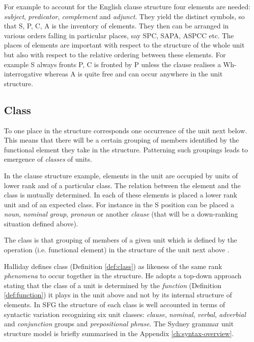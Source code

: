 For example to account for the English clause structure four elements are needed: \textit{subject}, \textit{predicator}, \textit{complement} and \textit{adjunct}. They yield the distinct symbols, so that S, P, C, A is the inventory of elements. They then can be arranged in various orders falling in particular places, say SPC, SAPA, ASPCC etc. The places of elements are important with respect to the structure of the whole unit but also with respect to the relative ordering between these elements. For example S always fronts P, C is fronted by P unless the clause realises a Wh-interrogative whereas A is quite free and can occur anywhere in the unit structure. 

\subsection{Class}

To one place in the structure corresponds one occurrence of the unit next below. This means that there will be a certain grouping of members identified by the functional element they take in the structure. Patterning such groupings leads to emergence of \textit{classes} of units.

In the clause structure example, elements in the unit are occupied by units of lower rank and of a particular class. The relation between the element and the class is mutually determined. In each of these elements is placed a lower rank unit and of an expected class. For instance in the S position can be placed a \textit{noun}, \textit{nominal group}, \textit{pronoun} or another \textit{clause} (that will be a down-ranking situation defined above).

\begin{definition}[Class]\label{def:class}
	The class is that grouping of members of a given unit which is defined by the operation (i.e. functional element) in the structure of the unit next above \citep[49]{Halliday2002}.
\end{definition}

Halliday defines class (Definition \ref{def:class}) as likeness of the same rank \textit{phenomena} to occur together in the structure. He adopts a top-down approach stating that the class of a unit is determined by the \textit{function} (Definition \ref{def:function}) it plays in the unit above and not by its internal structure of elements. In SFG the structure of each class is well accounted in terms of syntactic variation recognizing six unit classes: \textit{clause}, \textit{nominal}, \textit{verbal}, \textit{adverbial} and \textit{conjunction} groups and \textit{prepositional phrase}. The Sydney grammar unit structure model is briefly summarised in the Appendix \ref{ch:syntax-overview}.

